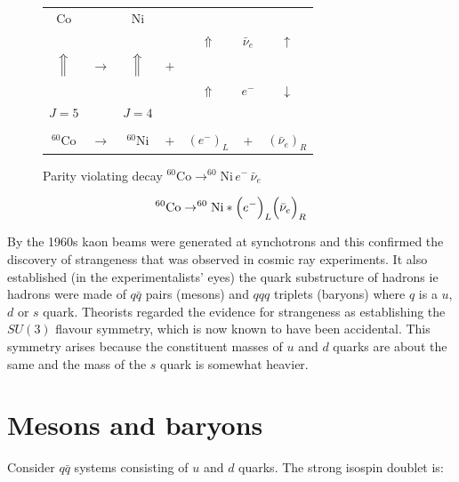 \begin{figure}
  \begin{center}
    \begin{tabular}{ccccccc}
      $\textrm{Co}$      &               & $\textrm{Ni}$      &     &            &               &                   \\
                         &               &                    &     & $\Uparrow$ & $\bar{\nu}_e$ & $\uparrow$        \\
      $\Big{\Uparrow}$   & $\rightarrow$ & $\Big{\Uparrow}$   & $+$ &            &               &                   \\
                         &               &                    &     & $\Uparrow$ & $e^-$         & $\downarrow$      \\
      $J=5$              &               & $J=4$              &     &            &               &                   \\
      &&&&&&\\
      $^{60}\textrm{Co}$ & $\rightarrow$ & $^{60}\textrm{Ni}$ & $+$ & $(e^-)_L$  & $+$           & $(\bar{\nu}_e)_R$ \\
    \end{tabular}
  \caption{Parity violating decay $^{60}\textrm{Co}\to ^{60}\textrm{Ni}\, e^- \,\bar{\nu}_e$}
  \label{fig:ch3_CoNi}
  \end{center}
\end{figure}

\[
  ^{60}\textrm{Co} \to ^{60}\textrm{Ni}* \Big(e^-\Big)_L \Big(\bar{\nu}_e\Big)_R
\]

By the 1960s kaon beams were generated at synchotrons and this confirmed the discovery of strangeness that was observed in cosmic ray experiments.  It also established (in the experimentalists' eyes) the quark substructure of hadrons ie hadrons were made of $q\bar{q}$ pairs (mesons) and $qqq$ triplets (baryons) where $q$ is a $u$, $d$ or $s$ quark.  Theorists regarded the evidence for strangeness as establishing the $SU(3)$ flavour symmetry, which is now known to have been accidental.  This symmetry arises because the constituent masses of $u$ and $d$ quarks are about the same and the mass of the $s$ quark is somewhat heavier.

\section{Mesons and baryons}

Consider $q\bar{q}$ systems consisting of $u$ and $d$ quarks.  The strong isospin doublet is:

